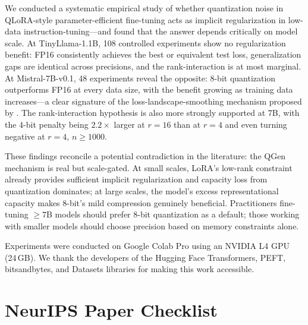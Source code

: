 \documentclass{article}
\begin{document}
We conducted a systematic empirical study of whether quantization noise in
QLoRA-style parameter-efficient fine-tuning acts as implicit regularization in
low-data instruction-tuning---and found that the answer depends critically on
model scale. At TinyLlama-1.1B, 108 controlled experiments show no regularization
benefit: FP16 consistently achieves the best or equivalent test loss, generalization
gaps are identical across precisions, and the rank-interaction is at most marginal.
At Mistral-7B-v0.1, 48 experiments reveal the opposite: 8-bit quantization
outperforms FP16 at every data size, with the benefit growing as training data
increases---a clear signature of the loss-landscape-smoothing mechanism proposed
by \citet{askarihemmat2024quantization}. The rank-interaction hypothesis is also
more strongly supported at 7B, with the 4-bit penalty being $2.2\times$ larger
at $r=16$ than at $r=4$ and even turning negative at $r=4$, $n \geq 1000$.

These findings reconcile a potential contradiction in the literature: the
QGen mechanism is real but scale-gated. At small scales, LoRA's low-rank
constraint already provides sufficient implicit regularization and capacity loss
from quantization dominates; at large scales, the model's excess representational
capacity makes 8-bit's mild compression genuinely beneficial. Practitioners fine-tuning
$\geq\!7$B models should prefer 8-bit quantization as a default; those working with
smaller models should choose precision based on memory constraints alone.

\begin{ack}
Experiments were conducted on Google Colab Pro using an NVIDIA L4 GPU (24\,GB).
We thank the developers of the Hugging Face Transformers, PEFT, bitsandbytes, and
Datasets libraries for making this work accessible.
\end{ack}




\newpage
\section*{NeurIPS Paper Checklist}
\end{document}
